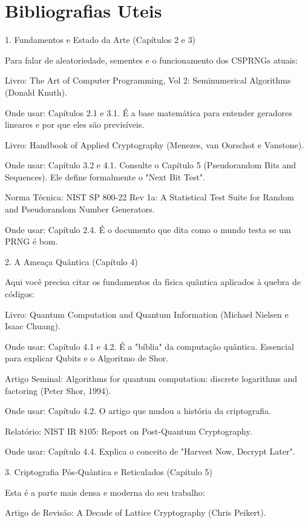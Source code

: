 \documentclass[
	12pt,				%
	openright,			%
	oneside,			%
	a4paper,			%
	portuguese,			%
	brazil				%
	]{abntex2}
\begin{document}
\chapter{Bibliografias Uteis}

1. Fundamentos e Estado da Arte (Capítulos 2 e 3)

Para falar de aleatoriedade, sementes e o funcionamento dos CSPRNGs atuais:

Livro: The Art of Computer Programming, Vol 2: Seminumerical Algorithms (Donald Knuth).

Onde usar: Capítulos 2.1 e 3.1. É a base matemática para entender geradores lineares e por que eles são previsíveis.

Livro: Handbook of Applied Cryptography (Menezes, van Oorschot e Vanstone).

Onde usar: Capítulo 3.2 e 4.1. Consulte o Capítulo 5 (Pseudorandom Bits and Sequences). Ele define formalmente o "Next Bit Test".

Norma Técnica: NIST SP 800-22 Rev 1a: A Statistical Test Suite for Random and Pseudorandom Number Generators.

Onde usar: Capítulo 2.4. É o documento que dita como o mundo testa se um PRNG é bom.

2. A Ameaça Quântica (Capítulo 4)

Aqui você precisa citar os fundamentos da física quântica aplicados à quebra de códigos:

Livro: Quantum Computation and Quantum Information (Michael Nielsen e Isaac Chuang).

        Onde usar: Capítulo 4.1 e 4.2. É a "bíblia" da computação quântica. Essencial para explicar Qubits e o Algoritmo de Shor.

    Artigo Seminal: Algorithms for quantum computation: discrete logarithms and factoring (Peter Shor, 1994).

        Onde usar: Capítulo 4.2. O artigo que mudou a história da criptografia.

    Relatório: NIST IR 8105: Report on Post-Quantum Cryptography.

        Onde usar: Capítulo 4.4. Explica o conceito de "Harvest Now, Decrypt Later".

3. Criptografia Pós-Quântica e Reticulados (Capítulo 5)

Esta é a parte mais densa e moderna do seu trabalho:

    Artigo de Revisão: A Decade of Lattice Cryptography (Chris Peikert).
\end{document}
